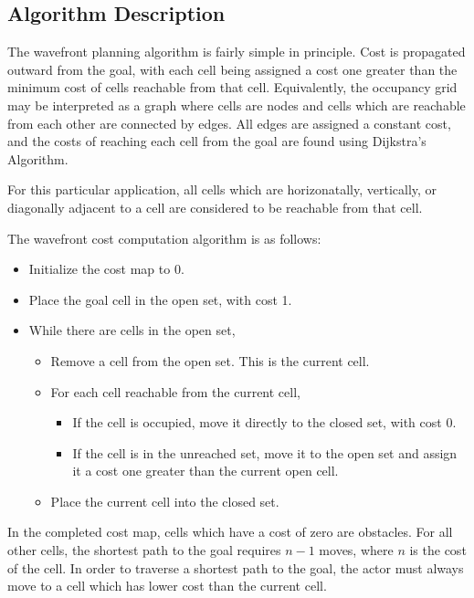 \documentclass{article}
\begin{document}
\subsection{Algorithm Description}

The wavefront planning algorithm is fairly simple in principle. Cost is
propagated outward from the goal, with each cell being assigned a cost one
greater than the minimum cost of cells reachable from that cell. Equivalently,
the occupancy grid may be interpreted as a graph where cells are nodes and
cells which are reachable from each other are connected by edges. All edges
are assigned a constant cost, and the costs of reaching each cell from the
goal are found using Dijkstra's Algorithm.

For this particular application, all cells which are horizonatally,
vertically, or diagonally adjacent to a cell are considered to be reachable
from that cell.

The wavefront cost computation algorithm is as follows:
\begin{itemize}
  \item Initialize the cost map to 0.
  
  \item Place the goal cell in the open set, with cost 1.
  
  \item While there are cells in the open set,
  \begin{itemize}
    \item Remove a cell from the open set. This is the current cell.
    
    \item For each cell reachable from the current cell,
    \begin{itemize}
      \item If the cell is occupied, move it directly to the closed set, with
      cost 0.
      
      \item If the cell is in the unreached set, move it to the open set and
      assign it a cost one greater than the current open cell.
    \end{itemize}
    \item Place the current cell into the closed set.
  \end{itemize}
\end{itemize}
In the completed cost map, cells which have a cost of zero are obstacles. For
all other cells, the shortest path to the goal requires $n - 1$ moves, where
$n$ is the cost of the cell. In order to traverse a shortest path to the goal,
the actor must always move to a cell which has lower cost than the current
cell.
\end{document}
